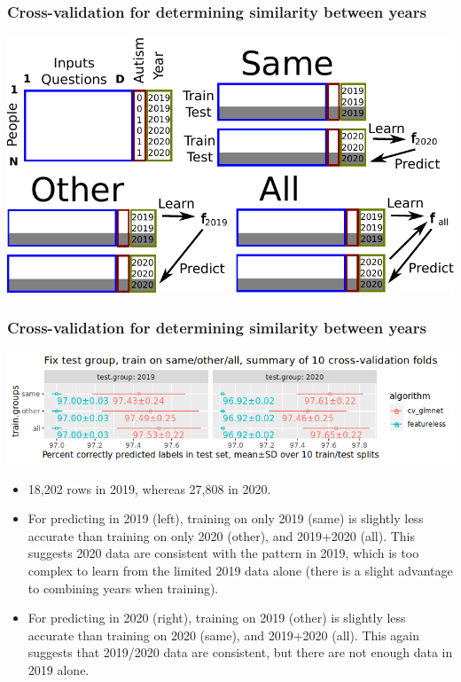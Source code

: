 \documentclass{beamer}
\begin{document}
\begin{frame}
  \frametitle{Cross-validation for determining similarity between years}
  \includegraphics[width=\textwidth]{drawing-cv-same-other-years-4.pdf}
\end{frame}

\begin{frame}
  \frametitle{Cross-validation for determining similarity between years}
  \includegraphics[width=\textwidth]{download-nsch-mlr3batchmark-registry-predict-new-year.png}
  \begin{itemize}
  \item 18,202 rows in 2019, whereas 27,808 in 2020.
  \item For predicting in 2019 (left), training on only 2019 (same) is
    slightly less accurate than training on only 2020 (other), and
    2019+2020 (all). This suggests 2020 data are consistent with the
    pattern in 2019, which is too complex to learn from the limited
    2019 data alone (there is a slight advantage to combining years
    when training).
  \item For predicting in 2020 (right), training on 2019 (other) is slightly less accurate than training on 2020 (same), and 2019+2020 (all). This again suggests that 2019/2020 data are consistent, but there are not enough data in 2019 alone.
  \end{itemize}
\end{frame}
\end{document}
